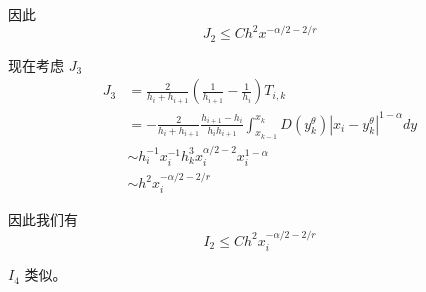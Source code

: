 \documentclass{ctexart}
\begin{document}
因此
\begin{equation}
    J_2 \le C h^2 x^{-\alpha/2-2/r}
\end{equation}

现在考虑 \(J_3\)
\begin{equation}
    \begin{aligned}
        J_3 & = \frac{2}{h_i + h_{i+1}}(\frac{1}{h_{i+1}} - \frac{1}{h_{i}}) T_{i,k}                                                            \\
            & = -\frac{2}{h_i + h_{i+1}}\frac{h_{i+1} -h_{i}}{h_{i}h_{i+1}} \int_{x_{k-1}}^{x_k} D(y_k^\theta) |x_i - y_k^\theta|^{1-\alpha} dy \\
            & \sim h_i^{-1}x_i^{-1} h_k^3 x_i^{\alpha/2-2} x_i^{1-\alpha}                                                                       \\
            & \sim h^2 x_i^{-\alpha/2-2/r}
    \end{aligned}
\end{equation}

因此我们有
\begin{equation}
    I_2 \le C h^2 x_i^{-\alpha/2-2/r}
\end{equation}

\(I_4\) 类似。

\newpage
\end{document}
